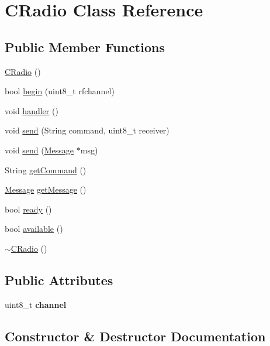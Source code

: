 \hypertarget{class_c_radio}{}\section{C\+Radio Class Reference}
\label{class_c_radio}
\subsection*{Public Member Functions}
\begin{DoxyCompactItemize}
\item 
\hyperlink{class_c_radio_af98a9479faedf9554e9314b9dc304e08}{C\+Radio} ()
\item 
bool \hyperlink{class_c_radio_ad31108fd9abdbbd4375982db055bc6c4}{begin} (uint8\+\_\+t rfchannel)
\item 
void \hyperlink{class_c_radio_a183b9b5793be1d712fc2135f6c35b7ea}{handler} ()
\item 
void \hyperlink{class_c_radio_aff4eca6c6d1255abe0b005c9cfdacb0a}{send} (String command, uint8\+\_\+t receiver)
\item 
void \hyperlink{class_c_radio_a46248b500efa212ed50f2896a877c421}{send} (\hyperlink{class_message}{Message} $\ast$msg)
\item 
String \hyperlink{class_c_radio_a4a1667eb762009621964b8ac4b699fc2}{get\+Command} ()
\item 
\hyperlink{class_message}{Message} \hyperlink{class_c_radio_afa712b350b446f1e213c1bf2e245435f}{get\+Message} ()
\item 
bool \hyperlink{class_c_radio_a62592f6755cf03360b432a3b09d9ad65}{ready} ()
\item 
bool \hyperlink{class_c_radio_ac8af18a6d53281e18c2931d5a8779da1}{available} ()
\item 
\hyperlink{class_c_radio_a434cee719712c101fdf58f8e4aed385a}{$\sim$\+C\+Radio} ()
\end{DoxyCompactItemize}
\subsection*{Public Attributes}
\begin{DoxyCompactItemize}
\item 
\mbox{\label{class_c_radio_a183ed07e980877b28c5ffd7ac9a2b97a}} 
uint8\+\_\+t {\bfseries channel}
\end{DoxyCompactItemize}


\subsection{Constructor \& Destructor Documentation}
\mbox{\label{class_c_radio_af98a9479faedf9554e9314b9dc304e08}} 
